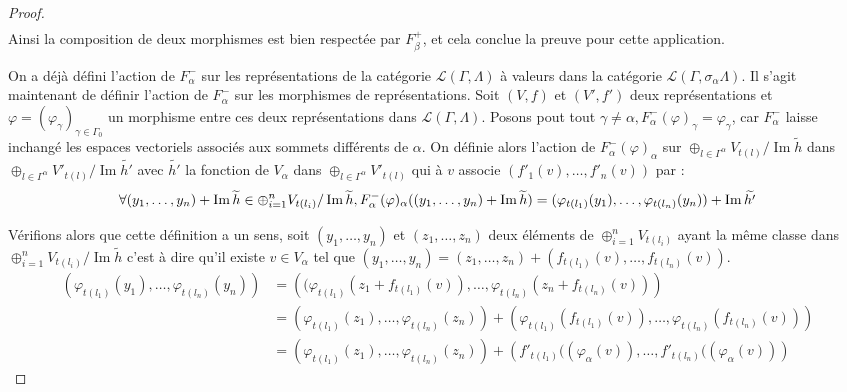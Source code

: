 \documentclass[a4paper,10pt]{article}
\DeclareMathOperator{\Img}{Im}
\begin{document}
\begin{proof}
\[\begin{array}{ll}
	\end{array}
\]
Ainsi la composition de deux morphismes est bien respectée par $F_{\beta}^{+}$, et cela conclue la preuve pour cette application.

On a déjà défini l'action de $F_{\alpha}^{-}$ sur les représentations de la catégorie $\mathscr L(\Gamma,\Lambda)$ à valeurs dans la catégorie $\mathscr L(\Gamma,\sigma_{\alpha}\Lambda)$. Il s'agit maintenant de définir l'action de $F_{\alpha}^{-}$ sur les morphismes de représentations. Soit $(V,f)$ et $(V',f')$ deux représentations et $\varphi = (\varphi_{\gamma})_{\gamma \in \Gamma_{0}}$ un morphisme entre ces deux représentations dans $\mathscr L(\Gamma,\Lambda)$. Posons pout tout $\gamma \neq \alpha, F_{\alpha}^{-}(\varphi)_{\gamma} = \varphi_{\gamma}$, car $F_{\alpha}^{-}$ laisse inchangé les espaces vectoriels associés aux sommets différents de $\alpha$. On définie alors l'action de  $F^{-}_{\alpha}(\varphi)_{\alpha}$ sur $\oplus_{l \in \Gamma^{\alpha}} V_{t(l)} / \Img \widetilde{h}$  dans $\oplus_{l \in \Gamma^{\alpha}} V'_{t(l)} / \Img \widetilde{h'}$ avec $\widetilde{h'}$ la fonction de $V_{\alpha}$ dans  $\oplus_{l \in \Gamma^{\alpha}} V'_{t(l)}$ qui à $v$ associe $(f'_{1}(v), \dots , f'_{n}(v))$ par : 
\[
\forall(y_{1}, \dots, y_{n})+ \Img \widetilde{h} \in  \oplus_{ i=1}^{n} V_{t(l_{i})} / \Img \widetilde{h}, \\ 
F_{\alpha}^{-}(\varphi)_{\alpha}((y_{1}, \dots, y_{n}) +\Img \widetilde{h}) = (\varphi_{t(l_{1})}(y_{1}), \dots , \varphi_{t(l_{n})}(y_{n})) + \Img \widetilde{h'}
\]

Vérifions alors que cette définition a un sens, soit $(y_{1}, \dots, y_{n})$ et $(z_{1}, \dots , z_{n})$ deux éléments de $\oplus_{i=1}^{n} V_{t(l_{i})}$ ayant la même classe dans $\oplus_{i=1}^{n} V_{t(l_{i})} / \Img \widetilde{h}$ c'est à dire qu'il existe $v \in V_{\alpha}$ tel que  $(y_{1}, \dots, y_{n}) = (z_{1}, \dots , z_{n}) + (f_{t(l_{1})}(v), \dots, f_{t(l_{n})}(v))$.
\[
\begin{array}{ll}
  \left(\varphi_{t(l_{1})}(y_{1}), \dots, \varphi_{t(l_{n})}(y_{n}) \right) &= \left((\varphi_{t(l_{1})}(z_{1} + f_{t(l_{1})}(v)), \dots, \varphi_{t(l_{n})}(z_{n} + f_{t(l_{n})}(v))\right) \\
  &= \left(\varphi_{t(l_{1})}(z_{1}), \dots, \varphi_{t(l_{n})}(z_{n})\right) + \left(\varphi_{t(l_{1})}(f_{t(l_{1})}(v)), \dots, \varphi_{t(l_{n})}(f_{t(l_{n})}(v)) \right)\\
&= \left(\varphi_{t(l_{1})}(z_{1}), \dots, \varphi_{t(l_{n})}(z_{n})\right) + \left(f'_{t(l_{1})}((\varphi_{\alpha}(v)), \dots, f'_{t(l_{n})}((\varphi_{\alpha}(v)) \right)
\end{array}
\]


\end{proof}
\end{document}

